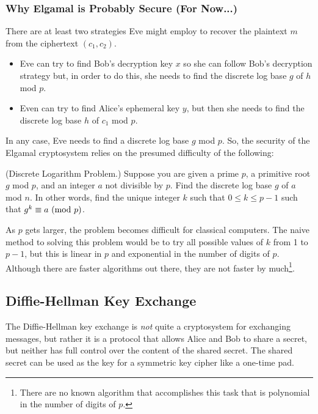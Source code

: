 \documentclass[letterpaper]{article}
\begin{document}
\subsubsection{Why Elgamal is Probably Secure (For Now...)}
There are at least two strategies Eve might employ to recover the plaintext $m$ from the ciphertext $(c_1, c_2)$. 
\begin{itemize}
    \item Eve can try to find Bob's decryption key $x$ so she can follow Bob's decryption strategy but, in order to do this, she needs to find the discrete log base $g$ of $h$ mod $p$. 
    \item Even can try to find Alice's ephemeral key $y$, but then she needs to find the discrete log base $h$ of $c_1$ mod $p$. 
\end{itemize}
In any case, Eve needs to find a discrete log base $g$ mod $p$. So, the security of the Elgamal cryptosystem relies on the presumed difficulty of the following: 
\begin{mdframed}[nobreak=true]
    (Discrete Logarithm Problem.) Suppose you are given a prime $p$, a primitive root $g$ mod $p$, and an integer $a$ not divisible by $p$. Find the discrete log base $g$ of $a$ mod $n$. In other words, find the unique integer $k$ such that $0 \leq k \leq p - 1$ such that $g^k \equiv a \ (\mathrm{mod}\ p)$. 
\end{mdframed}
As $p$ gets larger, the problem becomes difficult for classical computers. The naive method to solving this problem would be to try all possible values of $k$ from 1 to $p - 1$, but this is linear in $p$ and exponential in the number of digits of $p$. Although there are faster algorithms out there, they are not faster by much\footnote{There are no known algorithm that accomplishes this task that is polynomial in the number of digits of $p$.}.


\subsection{Diffie-Hellman Key Exchange}
The Diffie-Hellman key exchange is \emph{not} quite a cryptosystem for exchanging messages, but rather it is a protocol that allows Alice and Bob to share a secret, but neither has full control over the content of the shared secret. The shared secret can be used as the key for a symmetric key cipher like a one-time pad. 

\bigskip 
\end{document}
